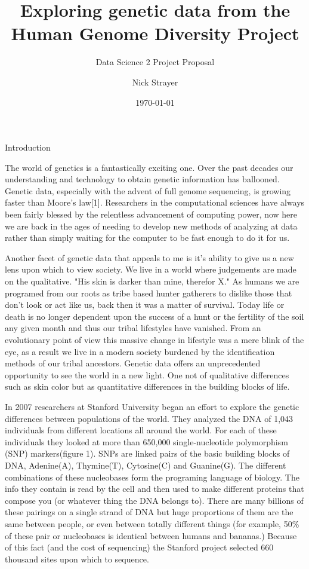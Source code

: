 \documentclass{scrartcl}
\begin{document}
\title{Exploring genetic data from the Human Genome Diversity Project}
\subtitle{Data Science 2 Project Proposal}
\author{Nick Strayer}
\date{\today} 
\maketitle

{ \Large Introduction}
\vspace{.7em}

The world of genetics is a fantastically exciting one. Over the past decades our understanding and technology to obtain genetic information has ballooned. Genetic data, especially with the advent of full genome sequencing, is growing faster than Moore's law[1]. Researchers in the computational sciences have always been fairly blessed by the relentless advancement of computing power, now here we are back in the ages of needing to develop new methods of analyzing at data rather than simply waiting for the computer to be fast enough to do it for us. 
\vspace{0.5em}

Another facet of genetic data that appeals to me is it's ability to give us a new lens upon which to view society. We live in a world where judgements are made on the qualitative. "His skin is darker than mine, therefor X." As humans we are programed from our roots as tribe based hunter gatherers to dislike those that don't look or act like us, back then it was a matter of survival. Today life or death is no longer dependent upon the success of a hunt or the fertility of the soil any given month and thus our tribal lifestyles have vanished. From an evolutionary point of view this massive change in lifestyle was a mere blink of the eye, as a result we live in a modern society burdened by the identification methods of our tribal ancestors. Genetic data offers an unprecedented opportunity to see the world in a new light. One not of qualitative differences such as skin color but as quantitative differences in the building blocks of life. 
\vspace{0.5em}

In 2007 researchers at Stanford University began an effort to explore the genetic differences between populations of the world. They analyzed the DNA of 1,043 individuals from different locations all around the world. For each of these individuals they looked at more than 650,000 single-nucleotide polymorphism (SNP) markers(figure 1).  SNPs are linked pairs of the basic building blocks of DNA, Adenine(A), Thymine(T), Cytosine(C) and Guanine(G). The different combinations of these nucleobases form the programing language of biology. The info they contain is read by the cell and then used to make different proteins that compose you (or whatever thing the DNA belongs to). There are many billions of these pairings on a single strand of DNA but huge proportions of them are the same between people, or even between totally different things (for example, 50\% of these pair or nucleobases is identical between humans and bananas.) Because of this fact (and the cost of sequencing) the Stanford project selected 660 thousand sites upon which to sequence. 
\end{document}
